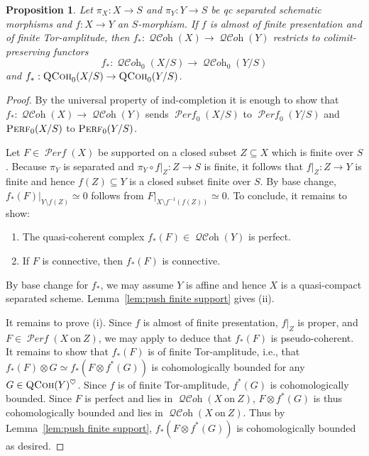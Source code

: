 \documentclass[12pt, oneside]{amsart}
\numberwithin{equation}{section}
\newtheorem{proposition}[subsubsection]{Proposition}
\theoremstyle{remark}
\theoremstyle{plain}
\DeclareMathOperator{\QCoh}{\textsc{QCoh}}
\DeclareMathOperator{\QCOH}{\mathcal{QC}\textit{oh}}
\DeclareMathOperator{\Perf}{\textsc{Perf}}
\DeclareMathOperator{\PERF}{\mathcal{P}\textit{erf}}
\begin{document}
\begin{proposition}\label{prop:push on QCoh0}
  Let $\pi_X: X \to S$ and $\pi_Y: Y \to S$ be qc separated schematic morphisms and $f: X \to Y$ an $S$-morphism.
  If $f$ is almost of finite presentation and of finite Tor-amplitude, then $f_* : \QCOH(X) \to \QCOH(Y)$ restricts to colimit-preserving functors
  \[
    f_* : \QCOH_0(X/S) \to \QCOH_0(Y/S)
  \]
  and $f_* : \QCoh_0(X/S) \to \QCoh_0(Y/S)$.
\end{proposition}
\begin{proof}
  By the universal property of ind-completion it is enough to show that $f_* : \QCOH(X) \to \QCOH(Y)$ sends $\PERF_0(X/S)$ to $\PERF_0(Y/S)$ and $\Perf_0(X/S)$ to $\Perf_0(Y/S)$.

  Let $F \in \PERF(X)$ be supported on a closed subset $Z \subseteq X$ which is finite over $S$.
  Because $\pi_Y$ is separated and $\pi_Y \circ f|_Z : Z \to S$ is finite, it follows that $f|_Z : Z \to Y$ is finite and hence $f(Z) \subseteq Y$ is a closed subset finite over $S$.
  By base change, $f_*(F)|_{Y\setminus f(Z)} \simeq 0$ follows from $F|_{X\setminus f^{-1}(f(Z))} \simeq 0$.
  To conclude, it remains to show:
  \begin{enumerate}
    \item The quasi-coherent complex $f_*(F) \in \QCOH(Y)$ is perfect.
    \item If $F$ is connective, then $f_*(F)$ is connective.
  \end{enumerate}
  By base change for $f_*$, we may assume $Y$ is affine and hence $X$ is a quasi-compact separated scheme.
  Lemma~\ref{lem:push finite support} gives (ii).

  It remains to prove (i).
  Since $f$ is almost of finite presentation, $f|_Z$ is proper, and $F \in \PERF(X~\mathrm{on}~Z)$, we may apply \cite[Prop.~5.6.5.2]{SAG} to deduce that $f_*(F)$ is pseudo-coherent.
  It remains to show that $f_*(F)$ is of finite Tor-amplitude, i.e., that $f_*(F) \otimes G \simeq f_*(F \otimes f^*(G))$ is cohomologically bounded for any $G \in \QCoh(Y)^\heartsuit$.
  Since $f$ is of finite Tor-amplitude, $f^*(G)$ is cohomologically bounded.
  Since $F$ is perfect and lies in $\QCOH(X~\mathrm{on}~Z)$, $F \otimes f^*(G)$ is thus cohomologically bounded and lies in $\QCOH(X~\mathrm{on}~Z)$.
  Thus by Lemma~\ref{lem:push finite support}, $f_*(F \otimes f^*(G))$ is cohomologically bounded as desired.
\end{proof}
\end{document}
